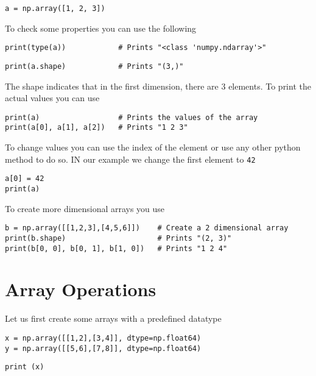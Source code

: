 \begin{verbatim}
a = np.array([1, 2, 3])   
\end{verbatim}

To check some properties you can use the following

\begin{verbatim}
print(type(a))            # Prints "<class 'numpy.ndarray'>"
\end{verbatim}

\begin{verbatim}
print(a.shape)            # Prints "(3,)"
\end{verbatim}

The shape indicates that in the first dimension, there are 3 elements.
To print the actual values you can use

\begin{verbatim}
print(a)                  # Prints the values of the array
print(a[0], a[1], a[2])   # Prints "1 2 3"
\end{verbatim}

To change values you can use the index of the element or use any other
python method to do so. IN our example we change the first element to
\texttt{42}

\begin{verbatim}
a[0] = 42                 
print(a)                  
\end{verbatim}

To create more dimensional arrays you use

\begin{verbatim}
b = np.array([[1,2,3],[4,5,6]])    # Create a 2 dimensional array
print(b.shape)                     # Prints "(2, 3)"
print(b[0, 0], b[0, 1], b[1, 0])   # Prints "1 2 4"
\end{verbatim}

\section{Array Operations}\label{array-operations}

Let us first create some arrays with a predefined datatype

\begin{verbatim}
x = np.array([[1,2],[3,4]], dtype=np.float64)
y = np.array([[5,6],[7,8]], dtype=np.float64)
\end{verbatim}

\begin{verbatim}
print (x)
\end{verbatim}

